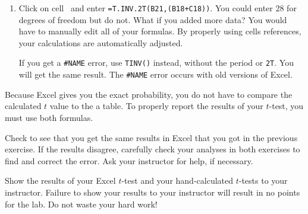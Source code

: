 \documentclass[12pt]{exam}
\newcommand*\xcell[1]{cell~\liningnum{#1}}
\begin{document}
\begin{enumerate}[resume]
	\item Click on \xcell{B22} and enter \texttt{=T.INV.2T(B21,(B18+C18))}. You could enter 28 for degrees of freedom but do not. What if you added more data? You would have to manually edit all of your formulas. By properly using cells references, your calculations are automatically adjusted. 
	
	If you get a \texttt{\#NAME} error, use \texttt{TINV()} instead, without the period or \texttt{2T}. You will get the same result. The \texttt{\#NAME} error occurs with old versions of Excel. 
\end{enumerate}
	
Because Excel gives you the exact probability, you do not have to compare the calculated $t$ value to the a table. To properly report the results of your $t$-test, you must use both formulas. 

\begin{questions}

\question
Check to see that you get the same results in Excel that you got in the previous exercise. If the results disagree, carefully check your analyses in both exercises to find and correct the error. Ask your instructor for help, if necessary.

\question[Checkout]
Show the results of your Excel $t$-test and your hand-calculated $t$-tests to your instructor. Failure to show your results to your instructor will result in no points for the lab. Do not waste your hard work!

\end{questions}
\end{document}
